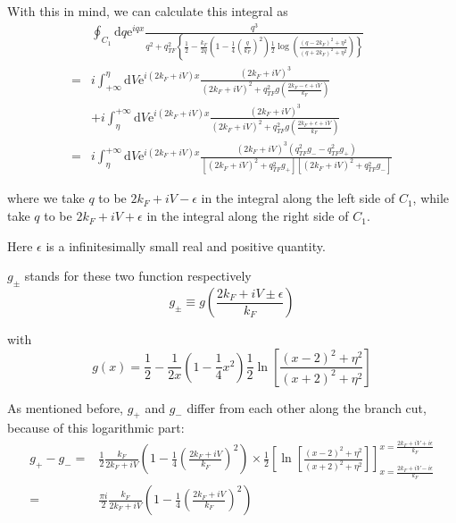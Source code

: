 \begin{itemize}
With this in mind, we can calculate this integral as
\begin{equation} \label{Eqs3.1.33} \begin{split}
&\oint_{C_1} \mathrm{d} q \mathrm{e}^{i q x} \frac{q^3}{q^2 + q_{TF}^2 \left\{\frac{1}{2}-\frac{k_F}{2q}\left( 1-\frac{1}{4}(\frac{q}{k_F})^2 \right) \frac{1}{2} \log \left( \frac{(q-2 k_F)^2 + \eta^2}{(q + 2 k_F)^2 + \eta^2}\right) \right\}}\\
=& i \int_{+\infty}^{\eta} \mathrm{d} V \mathrm{e}^{i(2 k_F+i V) x} \frac{(2 k_F+i V)^3}{(2 k_F+i V)^2 + q_{TF}^2 g\left( \frac{2 k_F - \epsilon + i V}{k_F} \right)}\\
&+i \int_{\eta}^{+\infty} \mathrm{d} V \mathrm{e}^{i(2 k_F+i V) x} \frac{(2 k_F+i V)^3}{(2 k_F+i V)^2 + q_{TF}^2 g\left( \frac{2 k_F + \epsilon + i V}{k_F} \right)}\\
=& i \int_{\eta}^{+\infty} \mathrm{d}V \mathrm{e}^{i(2 k_F+i V) x} \frac{(2 k_F+i V)^3\left( q_{TF}^2 g_- - q_{TF}^2 g_+ \right)}{\left[(2 k_F+i V)^2 + q_{TF}^2 g_+ \right]\left[(2 k_F+i V)^2 + q_{TF}^2 g_- \right]}
\end{split} \end{equation}

where we take $q$ to be $2 k_F +i V -\epsilon$ in the integral along the left side of $C_1$, while take $q$ to be $2 k_F +i V + \epsilon$ in the integral along the right side of $C_1$.

Here $\epsilon$ is a infinitesimally small real and positive quantity.

$g_\pm$ stands for these two function respectively
\[ g_\pm \equiv g\left( \frac{2 k_F + i V \pm \epsilon}{k_F} \right) \]

with
\[ g(x) = \frac{1}{2} - \frac{1}{2x} \left( 1- \frac{1}{4}x^2 \right) \frac{1}{2} \ln\left[ \frac{(x-2)^2 + \eta^2}{(x+2)^2+\eta^2} \right] \]

As mentioned before, $g_+$ and $g_-$ differ from each other along the branch cut, because of this logarithmic part:
\[\begin{split}
g_+-g_- = & \frac{1}{2} \frac{k_F}{2 k_F + i V} \left( 1- \frac{1}{4}\left( \frac{2 k_F +i V}{k_F} \right)^2 \right) \times \frac{1}{2} \left[ \ln \left[ \frac{(x-2)^2+\eta^2}{(x+2)^2+\eta^2}\right] \right]_{x=\frac{2 k_F +i V -i\epsilon}{k_F}}^{x=\frac{2 k_F +i V +i\epsilon}{k_F}}\\
=& \frac{\pi i}{2} \frac{k_F}{2 k_F + i V} \left( 1- \frac{1}{4}\left( \frac{2 k_F +i V}{k_F} \right)^2 \right)
\end{split}\]


\end{itemize}
